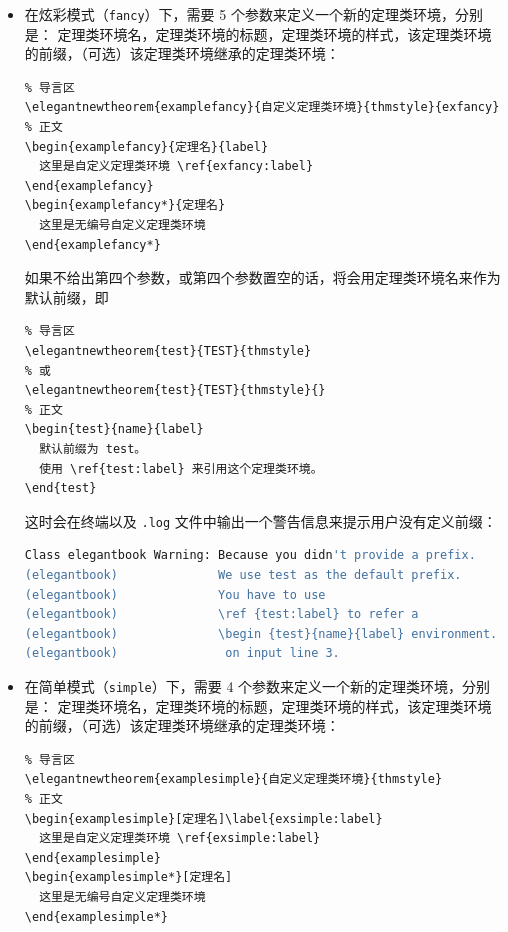 \documentclass[lang=cn,newtx,10pt,scheme=chinese]{elegantbook}
\begin{document}
\begin{itemize}
  \item 在炫彩模式（\lstinline{fancy}）下，需要 5 个参数来定义一个新的定理类环境，分别是：
  定理类环境名，定理类环境的标题，定理类环境的样式，该定理类环境的前缀，（可选）该定理类环境继承的定理类环境：

\begin{lstlisting}
% 导言区
\elegantnewtheorem{examplefancy}{自定义定理类环境}{thmstyle}{exfancy}
% 正文
\begin{examplefancy}{定理名}{label}
  这里是自定义定理类环境 \ref{exfancy:label}
\end{examplefancy}
\begin{examplefancy*}{定理名}
  这里是无编号自定义定理类环境
\end{examplefancy*}
\end{lstlisting}

  如果不给出第四个参数，或第四个参数置空的话，将会用定理类环境名来作为默认前缀，即
\begin{lstlisting}
% 导言区
\elegantnewtheorem{test}{TEST}{thmstyle}
% 或
\elegantnewtheorem{test}{TEST}{thmstyle}{}
% 正文
\begin{test}{name}{label}
  默认前缀为 test。
  使用 \ref{test:label} 来引用这个定理类环境。
\end{test}
\end{lstlisting}

这时会在终端以及 \verb|.log| 文件中输出一个警告信息来提示用户没有定义前缀：

\begin{lstlisting}[language=bash]
Class elegantbook Warning: Because you didn't provide a prefix. 
(elegantbook)              We use test as the default prefix. 
(elegantbook)              You have to use 
(elegantbook)              \ref {test:label} to refer a 
(elegantbook)              \begin {test}{name}{label} environment. 
(elegantbook)               on input line 3.
\end{lstlisting}

  \item 在简单模式（\lstinline{simple}）下，需要 4 个参数来定义一个新的定理类环境，分别是：
  定理类环境名，定理类环境的标题，定理类环境的样式，该定理类环境的前缀，（可选）该定理类环境继承的定理类环境：
\begin{lstlisting}
% 导言区
\elegantnewtheorem{examplesimple}{自定义定理类环境}{thmstyle}
% 正文
\begin{examplesimple}[定理名]\label{exsimple:label}
  这里是自定义定理类环境 \ref{exsimple:label}
\end{examplesimple}
\begin{examplesimple*}[定理名]
  这里是无编号自定义定理类环境
\end{examplesimple*}
\end{lstlisting}


\end{itemize}
\end{document}
